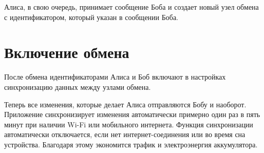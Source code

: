 \documentclass[a4paper,10pt,russian]{sphinxmanual}
\begin{document}
\noindent{}

\noindent{}

\noindent{}

Алиса, в свою очередь, принимает сообщение Боба и создает новый узел обмена с идентификатором, который указан в сообщении Боба.


\section{Включение обмена}
\label{\detokenize{teamwork:id6}}
После обмена идентификаторами Алиса и Боб включают в настройках синхронизацию данных между узлами обмена.

\noindent{}

\noindent{}

\noindent{}

\noindent{}

Теперь все изменения, которые делает Алиса отправляются Бобу и наоборот. Приложение синхронизирует изменения
автоматически примерно один раз в пять минут при наличии Wi-Fi или мобильного интернета. Функция синхронизации
автоматически отключается, если нет интернет-соединения или во время сна устройства. Благодаря этому
экономится трафик и электроэнергия аккумулятора.
\end{document}
